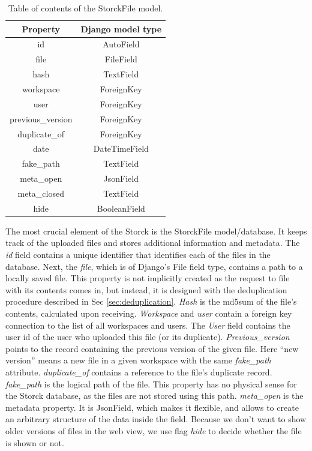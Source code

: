 \begin{table}[h]
\begin{center}
\begin{tabular}{ |c|c| }
\hline
Property & Django model type \\
\hline
id & AutoField \\
file & FileField \\
hash & TextField \\
workspace & ForeignKey \\
user & ForeignKey \\
previous\_version & ForeignKey \\
duplicate\_of & ForeignKey \\
date & DateTimeField \\
fake\_path & TextField \\
meta\_open & JsonField \\
meta\_closed & TextField \\
hide & BooleanField \\
\hline
\end{tabular}
\caption{\label{tab:storck_filesfield}Table of contents of the StorckFile model.}
\end{center}
\end{table}

The most crucial element of the Storck is the StorckFile model/database. It keeps track of the uploaded files and stores additional information and metadata.
The \textit{id} field contains a unique identifier that identifies each of the files in the database.
Next, the \textit{file}, which is of Django's File field type, contains a path to a locally saved file.
This property is not implicitly created as the request to file with its contents comes in, but instead, it is designed with the deduplication procedure described in Sec \ref{sec:deduplication}.
\textit{Hash} is the md5sum of the file's contents, calculated upon receiving.
\textit{Workspace} and \textit{user} contain a foreign key connection to the list of all workspaces and users.
The \textit{User} field contains the user id of the user who uploaded this file (or its duplicate).
\textit{Previous\_version} points to the record containing the previous version of the given file.
Here ``new version'' means a new file in a given workspace with the same \textit{fake\_path} attribute.
\textit{duplicate\_of} contains a reference to the file's duplicate record.
\textit{fake\_path} is the logical path of the file.
This property has no physical sense for the Storck database, as the files are not stored using this path.
\textit{meta\_open} is the metadata property.
It is JsonField, which makes it flexible, and allows to create an arbitrary structure of the data inside the field.
Because we don't want to show older versions of files in the web view, we use flag \textit{hide} to decide whether the file is shown or not.


